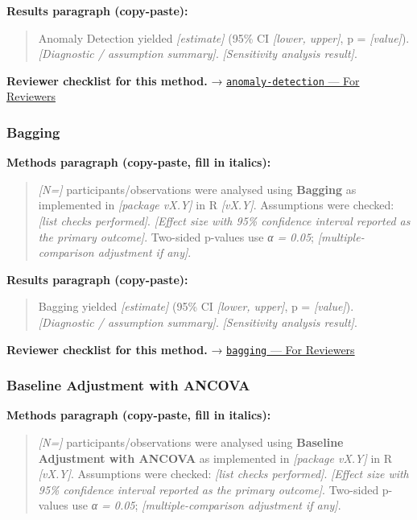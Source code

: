 \documentclass[
]{article}
\begin{document}
\textbf{Results paragraph (copy-paste):}

\begin{quote}
Anomaly Detection yielded \emph{{[}estimate{]}} (95\% CI \emph{{[}lower,
upper{]}}, p = \emph{{[}value{]}}). \emph{{[}Diagnostic / assumption
summary{]}}. \emph{{[}Sensitivity analysis result{]}}.
\end{quote}

\textbf{Reviewer checklist for this method.} →
\href{../chapters/13-ml/anomaly-detection.Rmd\#for-reviewers}{\texttt{anomaly-detection}
--- For Reviewers}

\subsubsection{Bagging}\label{bagging}

\textbf{Methods paragraph (copy-paste, fill in italics):}

\begin{quote}
\emph{{[}N={]}} participants/observations were analysed using
\textbf{Bagging} as implemented in \emph{{[}package vX.Y{]}} in R
\emph{{[}vX.Y{]}}. Assumptions were checked: \emph{{[}list checks
performed{]}}. \emph{{[}Effect size with 95\% confidence interval
reported as the primary outcome{]}}. Two-sided p-values use \emph{α =
0.05}; \emph{{[}multiple-comparison adjustment if any{]}}.
\end{quote}

\textbf{Results paragraph (copy-paste):}

\begin{quote}
Bagging yielded \emph{{[}estimate{]}} (95\% CI \emph{{[}lower,
upper{]}}, p = \emph{{[}value{]}}). \emph{{[}Diagnostic / assumption
summary{]}}. \emph{{[}Sensitivity analysis result{]}}.
\end{quote}

\textbf{Reviewer checklist for this method.} →
\href{../chapters/13-ml/bagging.Rmd\#for-reviewers}{\texttt{bagging} ---
For Reviewers}

\subsubsection{Baseline Adjustment with
ANCOVA}\label{baseline-adjustment-with-ancova}

\textbf{Methods paragraph (copy-paste, fill in italics):}

\begin{quote}
\emph{{[}N={]}} participants/observations were analysed using
\textbf{Baseline Adjustment with ANCOVA} as implemented in
\emph{{[}package vX.Y{]}} in R \emph{{[}vX.Y{]}}. Assumptions were
checked: \emph{{[}list checks performed{]}}. \emph{{[}Effect size with
95\% confidence interval reported as the primary outcome{]}}. Two-sided
p-values use \emph{α = 0.05}; \emph{{[}multiple-comparison adjustment if
any{]}}.
\end{quote}
\end{document}
